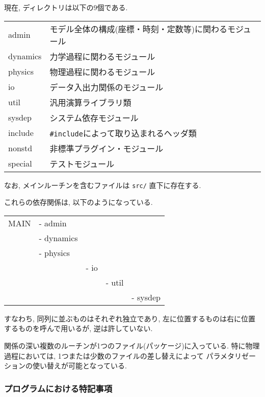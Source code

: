 現在, ディレクトリは以下の9個である. 
\begin{center}
\begin{tabular}{ll}
admin      &       モデル全体の構成(座標・時刻・定数等)に関わるモジュール \\
dynamics   &       力学過程に関わるモジュール\\
physics    &       物理過程に関わるモジュール\\
io         &       データ入出力関係のモジュール \\
util       &       汎用演算ライブラリ類 \\
sysdep     &       システム依存モジュール \\
include    &       {\tt \#include}によって取り込まれるヘッダ類 \\
nonstd     &       非標準プラグイン・モジュール \\
special    &       テストモジュール \\
\end{tabular}
\end{center}
なお, メインルーチンを含むファイルは {\tt src/} 直下に存在する.

これらの依存関係は, 以下のようになっている. 
\begin{center}
\begin{tabular}{lllll}
MAIN & - admin     & \\
     & - dynamics  & \\
     & - physics   & \\
     &             & - io   & \\
     &             &        & - util & \\
     &             &        &        & - sysdep \\
\end{tabular}
\end{center}
すなわち, 同列に並ぶものはそれぞれ独立であり,
左に位置するものは右に位置するものを呼んで用いるが, 逆は許していない.

関係の深い複数のルーチンが1つのファイル(パッケージ)に入っている.
特に物理過程においては, 1つまたは少数のファイルの差し替えによって
パラメタリゼーションの使い替えが可能となっている.

\subsubsection{プログラムにおける特記事項}

